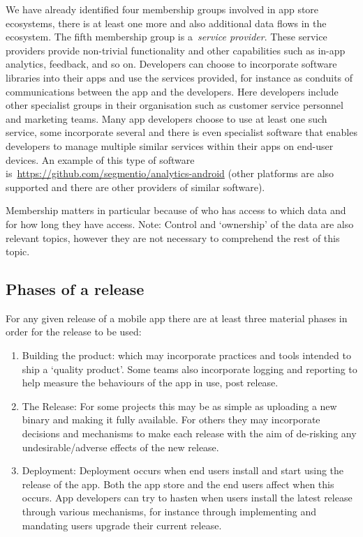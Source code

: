 We have already identified four membership groups involved in app store ecosystems, there is at least one more and also additional data flows in the ecosystem. The fifth membership group is a~\emph{service provider}. These service providers provide non-trivial functionality and other capabilities such as in-app analytics, feedback, and so on. Developers can choose to incorporate software libraries into their apps and use the services provided, for instance as conduits of communications between the app and the developers. Here developers include other specialist groups in their organisation such as customer service personnel and marketing teams. Many app developers choose to use at least one such service, some incorporate several and there is even specialist software that enables developers to manage multiple similar services within their apps on end-user devices. An example of this type of software is~\url{https://github.com/segmentio/analytics-android} (other platforms are also supported and there are other providers of similar software).

Membership matters in particular because of who has access to which data and for how long they have access. Note: Control and `ownership' of the data are also relevant topics, however they are not necessary to comprehend the rest of this topic. %

\subsection{Phases of a release}

For any given release of a mobile app there are at least three material phases in order for the release to be used:
\begin{enumerate}
    \item Building the product: which may incorporate practices and tools intended to ship a `quality product'. Some teams also incorporate logging and reporting to help measure the behaviours of the app in use, post release.
    \item The Release: For some projects this may be as simple as uploading a new binary and making it fully available. For others they may incorporate decisions and mechanisms to make each release with the aim of de-risking any undesirable/adverse effects of the new release.
    \item Deployment: Deployment occurs when end users install and start using the release of the app. Both the app store and the end users affect when this occurs. App developers can try to hasten when users install the latest release through various mechanisms, for instance through implementing and mandating users upgrade their current release.
\end{enumerate}

